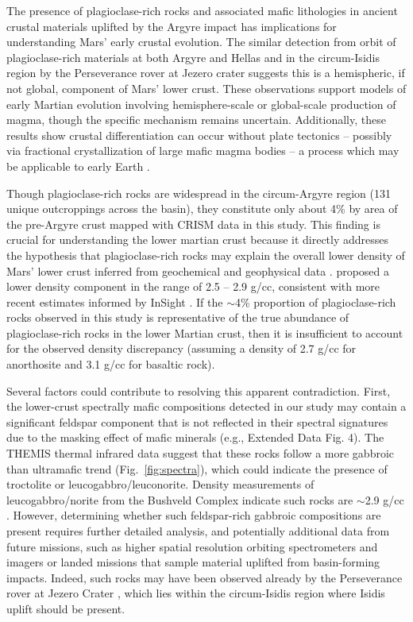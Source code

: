 \documentclass[12pt]{article}
\begin{document}
The presence of plagioclase-rich rocks and associated mafic lithologies in ancient crustal materials uplifted by the Argyre impact has implications for understanding Mars' early crustal evolution. The similar detection from orbit of plagioclase-rich materials at both Argyre and Hellas \citep{Phillips2022} and in the circum-Isidis region by the Perseverance rover at Jezero crater suggests this is a hemispheric, if not global, component of Mars' lower crust. These observations support models of early Martian evolution involving hemisphere-scale or global-scale production of magma, though the specific mechanism remains uncertain. Additionally, these results show crustal differentiation can occur without plate tectonics -- possibly via fractional crystallization of large mafic magma bodies -- a process which may be applicable to early Earth \citep{Kranendonk2010}.

Though plagioclase-rich rocks are widespread in the circum-Argyre region (131 unique outcroppings across the basin), they constitute only about 4\% by area of the pre-Argyre crust mapped with CRISM data in this study. This finding is crucial for understanding the lower martian crust because it directly addresses the hypothesis that plagioclase-rich rocks may explain the overall lower density of Mars' lower crust inferred from geochemical and geophysical data \citep{Baratoux2014, Goossens2017, Knapmeyer-Endrun2021, Drilleau2023, Joshi2023}. \citet{Baratoux2014} proposed a lower density component in the range of 2.5 – 2.9 g/cc, consistent with more recent estimates informed by InSight \citep[e.g.,][]{Knapmeyer-Endrun2021}. If the $\sim$4\% proportion of plagioclase-rich rocks observed in this study is representative of the true abundance of plagioclase-rich rocks in the lower Martian crust, then it is insufficient to account for the observed density discrepancy (assuming a density of 2.7 g/cc for anorthosite and 3.1 g/cc for basaltic rock).

Several factors could contribute to resolving this apparent contradiction. First, the lower-crust spectrally mafic compositions detected in our study may contain a significant feldspar component that is not reflected in their spectral signatures due to the masking effect of mafic minerals (e.g., Extended Data Fig. 4). The THEMIS thermal infrared data suggest that these rocks follow a more gabbroic than ultramafic trend (Fig.~\ref{fig:spectra}), which could indicate the presence of troctolite or leucogabbro/leuconorite. Density measurements of leucogabbro/norite from the Bushveld Complex indicate such rocks are $\sim$2.9 g/cc \citep{Roelofse2010}. However, determining whether such feldspar-rich gabbroic compositions are present requires further detailed analysis, and potentially additional data from future missions, such as higher spatial resolution orbiting spectrometers and imagers or landed missions that sample material uplifted from basin-forming impacts. Indeed, such rocks may have been observed already by the Perseverance rover at Jezero Crater \citep{Bedford2024, Schmidt2025}, which lies within the circum-Isidis region where Isidis uplift should be present.
\end{document}

